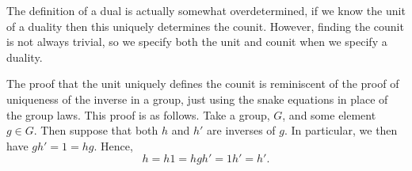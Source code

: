 \documentclass[fleqn]{NotesClass}
\begin{document}
    The definition of a dual is actually somewhat overdetermined, if we know the unit of a duality then this uniquely determines the counit.
    However, finding the counit is not always trivial, so we specify both the unit and counit when we specify a duality.
    
    The proof that the unit uniquely defines the counit is reminiscent of the proof of uniqueness of the inverse in a group, just using the snake equations in place of the group laws.
    This proof is as follows.
    Take a group, \(G\), and some element \(g \in G\).
    Then suppose that both \(h\) and \(h'\) are inverses of \(g\).
    In particular, we then have \(gh' = 1 = hg\).
    Hence,
    \begin{equation}
        h = h1 = hgh' = 1h' = h'.
    \end{equation}
    
\end{document}
